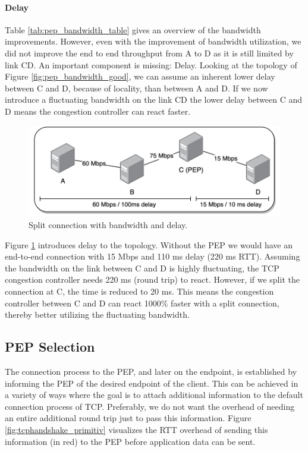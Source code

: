 \documentclass[a4paper,english, 12pt]{report}
\begin{document}
\paragraph{Delay}
Table \ref{tab:pep_bandwidth_table} gives an overview of the bandwidth improvements. However, even with the improvement of bandwidth utilization, we did not improve the end to end throughput from A to D as it is still limited by link CD. An important component is missing: Delay. Looking at the topology of Figure \ref{fig:pep_bandwidth_good}, we can assume an inherent lower delay between C and D, because of locality, than between A and D. If we now introduce a fluctuating bandwidth on the link CD the lower delay between C and D means the congestion controller can react faster.\\

\begin{figure}[h!] %
	\centering
	\includegraphics[scale=0.6]{../diagrams/drawio/bandwidth_delay.png}
  	\caption{Split connection with bandwidth and delay.}
  	\label{fig:pep_bandwidth_delay}
\end{figure}

Figure \ref{fig:pep_bandwidth_delay} introduces delay to the topology. Without the PEP we would have an end-to-end connection with 15 Mbps and 110 ms delay (220 ms RTT). Assuming the bandwidth on the link between C and D is highly fluctuating, the TCP congestion controller needs 220 ms (round trip) to react. However, if we split the connection at C, the time is reduced to 20 ms. This means the congestion controller between C and D can react 1000\% faster with a split connection, thereby better utilizing the fluctuating bandwidth.
 
\subsection{PEP Selection}
The connection process to the PEP, and later on the endpoint, is established by informing the PEP of the desired endpoint of the client. This can be achieved in a variety of ways where the goal is to attach additional information to the default connection process of TCP. Preferably, we do not want the overhead of needing an entire additional round trip just to pass this information. Figure \ref{fig:tcphandshake_primitiv} visualizes the RTT overhead of sending this information (in red) to the PEP before application data can be sent.\\
\end{document}
